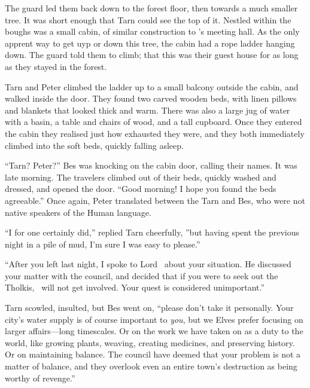The guard led them back down to the forest floor, then towards a much smaller tree.  It was short enough that Tarn could see the top of it.  Nestled within the boughs was a small cabin, of similar construction to \arilor's meeting hall.  As the only apprent way to get uyp or down this tree, the cabin had a rope ladder hanging down.  The guard told them to climb; that this was their guest house for as long as they stayed in the forest.

Tarn and Peter climbed the ladder up to a small balcony outside the cabin, and walked inside the door.  They found two carved wooden beds, with linen pillows and blankets that looked thick and warm.  There was also a large jug of water with a basin, a table and chairs of wood, and a tall cupboard.  Once they entered the cabin they realised just how exhausted they were, and they both immediately climbed into the soft beds, quickly falling asleep.


``Tarn?  Peter?''  Bes was knocking on the cabin door, calling their names.  It was late morning.  The travelers climbed out of their beds, quickly washed and dressed, and opened the door.  ``Good morning!  I hope you found the beds agreeable.''  Once again, Peter translated between the Tarn and Bes, who were not native speakers of the Human language.

``I for one certainly did,'' replied Tarn cheerfully, ''but having spent the previous night in a pile of mud, I'm sure I was easy to please.''

``After you left last night, I spoke to Lord \arilor\ about your situation.  He discussed your matter with the council, and decided that if you were to seek out the Tholkis, \inarthonor\ will not get involved.  Your quest is considered unimportant.''

Tarn scowled, insulted, but Bes went on, ``please don't take it personally.  Your city's water supply is of course important to \emph{you}, but we Elves prefer focusing on larger affairs---long timescales.  Or on the work we have taken on as a duty to the world, like growing plants, weaving, creating medicines, and preserving history.  Or on maintaining balance.  The council have deemed that your problem is not a matter of balance, and they overlook even an entire town's destruction as being worthy of revenge.''

